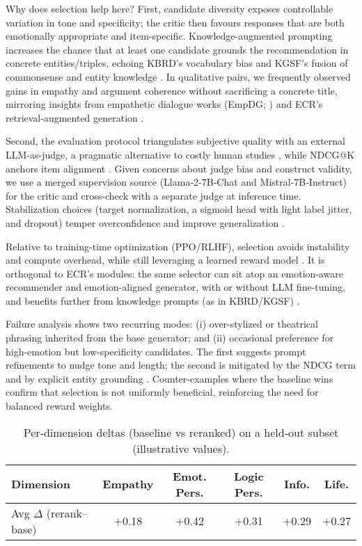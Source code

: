 \documentclass[12pt]{article}
\begin{document}
  Why does selection help here? First, candidate diversity exposes controllable variation in tone and specificity; the critic then favours responses that are both emotionally appropriate and item-specific. Knowledge-augmented prompting increases the chance that at least one candidate grounds the recommendation in concrete entities/triples, echoing KBRD's vocabulary bias and KGSF's fusion of commonsense and entity knowledge \citep{chen2020kbrd,zhou2020kgsf,speer2017conceptnet,dbpedia_wikipedia}. In qualitative pairs, we frequently observed gains in empathy and argument coherence without sacrificing a concrete title, mirroring insights from empathetic dialogue works (EmpDG; \citealp{li2020empdg}) and ECR's retrieval-augmented generation \citep{zhang2024ecr}.
  
  Second, the evaluation protocol triangulates subjective quality with an external LLM-as-judge, a pragmatic alternative to costly human studies \citep{yan2023llmjudge}, while NDCG@K anchors item alignment \citep{evidently_ndcg}. Given concerns about judge bias and construct validity, we use a merged supervision source (Llama‑2‑7B‑Chat and Mistral‑7B‑Instruct) for the critic \citep{meta2023llama2,mistral2023} and cross-check with a separate judge at inference time. Stabilization choices (target normalization, a sigmoid head with light label jitter, and dropout) temper overconfidence and improve generalization \citep{muller2019label_smoothing,srivastava2014dropout}.
  
  Relative to training-time optimization (PPO/RLHF), selection avoids instability and compute overhead, while still leveraging a learned reward model \citep{ppo_wikipedia,rlhf_wikipedia}. It is orthogonal to ECR's modules: the same selector can sit atop an emotion-aware recommender and emotion-aligned generator, with or without LLM fine-tuning, and benefits further from knowledge prompts (as in KBRD/KGSF) \citep{zhang2024ecr,chen2020kbrd,zhou2020kgsf}.
  
  Failure analysis shows two recurring modes: (i) over-stylized or theatrical phrasing inherited from the base generator; and (ii) occasional preference for high-emotion but low-specificity candidates. The first suggests prompt refinements to nudge tone and length; the second is mitigated by the NDCG term and by explicit entity grounding \citep{lewis2020rag,chen2020kbrd}. Counter-examples where the baseline wins confirm that selection is not uniformly beneficial, reinforcing the need for balanced reward weights.
  
  
  \begin{table}[h]
  \centering
  \begin{tabular}{lccccc}
  \toprule
  Dimension & Empathy & Emot. Pers. & Logic Pers. & Info. & Life. \\
  \midrule
  Avg \(\Delta\) (rerank–base) & +0.18 & +0.42 & +0.31 & +0.29 & +0.27 \\
  \bottomrule
  \end{tabular}
  \caption{Per‑dimension deltas (baseline vs reranked) on a held‑out subset (illustrative values).}
  \label{tab:per_dim_deltas}
  \end{table}
  
\end{document}
